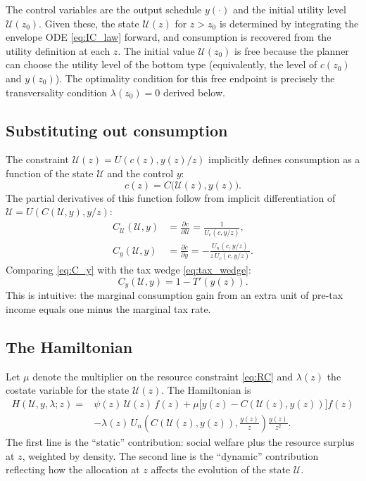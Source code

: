 \documentclass[12pt,a4paper]{article}
\theoremstyle{definition}
\theoremstyle{plain}
\theoremstyle{remark}
\newcommand{\zlow}{z_{\scriptscriptstyle 0}}
\newcommand{\calU}{\mathcal{U}}
\begin{document}
The control variables are the output schedule $y(\cdot)$ and the initial utility level $\calU(\zlow)$. Given these, the state $\calU(z)$ for $z > \zlow$ is determined by integrating the envelope ODE \eqref{eq:IC_law} forward, and consumption is recovered from the utility definition at each $z$. The initial value $\calU(\zlow)$ is free because the planner can choose the utility level of the bottom type (equivalently, the level of $c(\zlow)$ and $y(\zlow)$). The optimality condition for this free endpoint is precisely the transversality condition $\lambda(\zlow) = 0$ derived below.

\subsection{Substituting out consumption}

The constraint $\calU(z) = U(c(z), y(z)/z)$ implicitly defines consumption as a function of the state $\calU$ and the control $y$:
\begin{equation}
\label{eq:c_implicit}
  c(z) = C\bigl(\calU(z), y(z)\bigr).
\end{equation}
The partial derivatives of this function follow from implicit differentiation of $\calU = U(C(\calU, y), y/z)$:
\begin{align}
  C_{\calU}(\calU, y) &= \frac{\partial c}{\partial \calU} = \frac{1}{U_c(c, y/z)},
  \label{eq:C_U} \\[4pt]
  C_y(\calU, y) &= \frac{\partial c}{\partial y} = -\frac{U_n(c, y/z)}{z \, U_c(c, y/z)}.
  \label{eq:C_y}
\end{align}
Comparing \eqref{eq:C_y} with the tax wedge \eqref{eq:tax_wedge}:
\begin{equation}
\label{eq:Cy_tax}
  C_y(\calU, y) = 1 - T'(y(z)).
\end{equation}
This is intuitive: the marginal consumption gain from an extra unit of pre-tax income equals one minus the marginal tax rate.

\subsection{The Hamiltonian}

Let $\mu$ denote the multiplier on the resource constraint \eqref{eq:RC} and $\lambda(z)$ the costate variable for the state $\calU(z)$. The Hamiltonian is
\begin{equation}
\label{eq:Hamiltonian}
\begin{split}
  H(\calU, y, \lambda; z) = {} &
  \psi(z) \, \calU(z) \, f(z)
  + \mu \bigl[ y(z) - C(\calU(z), y(z)) \bigr] f(z) \\
  & - \lambda(z) \, U_n\!\left(C(\calU(z), y(z)), \frac{y(z)}{z}\right) \frac{y(z)}{z^2}.
\end{split}
\end{equation}
The first line is the ``static'' contribution: social welfare plus the resource surplus at $z$, weighted by density. The second line is the ``dynamic'' contribution reflecting how the allocation at $z$ affects the evolution of the state $\calU$.
\end{document}
